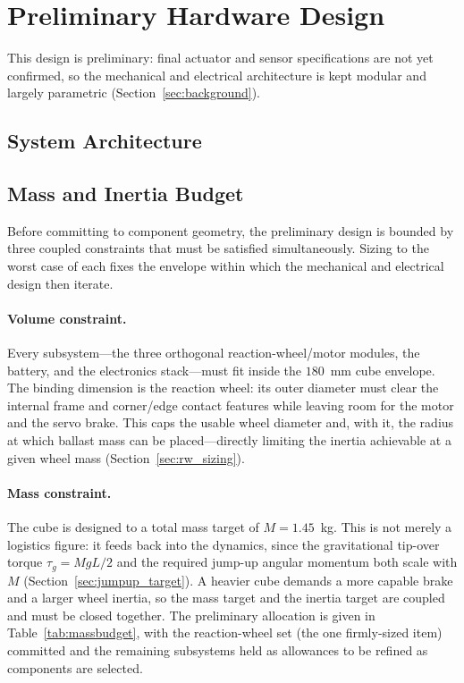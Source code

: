 \section{Preliminary Hardware Design}
\label{sec:hardware}

This design is preliminary: final actuator and sensor specifications are not yet
confirmed, so the mechanical and electrical architecture is kept modular and
largely parametric (Section~\ref{sec:background}).

\subsection{System Architecture}
\label{sec:architecture}


\subsection{Mass and Inertia Budget}
\label{sec:massbudget}

Before committing to component geometry, the preliminary design is bounded by
three coupled constraints that must be satisfied simultaneously. Sizing to the
worst case of each fixes the envelope within which the mechanical and electrical
design then iterate.

\paragraph{Volume constraint.} Every subsystem---the three orthogonal
reaction-wheel/motor modules, the battery, and the electronics stack---must fit
inside the $180$~mm cube envelope. The binding dimension is the reaction wheel:
its outer diameter must clear the internal frame and corner/edge contact
features while leaving room for the motor and the servo brake. This caps the
usable wheel diameter and, with it, the radius at which ballast mass can be
placed---directly limiting the inertia achievable at a given wheel mass
(Section~\ref{sec:rw_sizing}).

\paragraph{Mass constraint.} The cube is designed to a total mass target of
$M = 1.45$~kg. This is not merely a logistics figure: it feeds back into the
dynamics, since the gravitational tip-over torque $\tau_g = MgL/2$ and the
required jump-up angular momentum both scale with $M$ (Section~\ref{sec:jumpup_target}).
A heavier cube demands a more capable brake and a larger wheel inertia, so the
mass target and the inertia target are coupled and must be closed together. The
preliminary allocation is given in Table~\ref{tab:massbudget}, with the
reaction-wheel set (the one firmly-sized item) committed and the remaining
subsystems held as allowances to be refined as components are selected.

